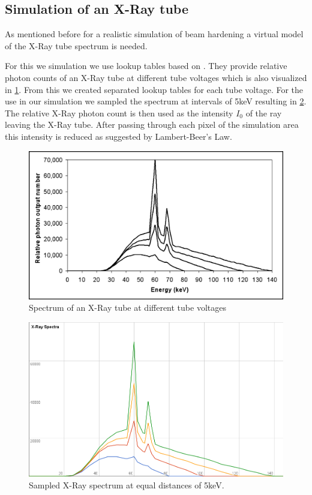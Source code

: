 \subsection{Simulation of an X-Ray tube}
\par As mentioned before for a realistic simulation of beam hardening a virtual model of the X-Ray tube spectrum is needed.\cite{XRayTubeSpectrum}
\par For this we simulation we use lookup tables based on \cite{XRayTubeSpectrum}. They provide relative photon counts of an X-Ray tube at different tube voltages which is also visualized in \ref{f5}. From this we created separated lookup tables for each tube voltage. For the use in our simulation we sampled the spectrum at intervals of 5keV resulting in \ref{SampledTubeSpectrum}. The relative X-Ray photon count is then used as the intensity \(I_{0}\) of the ray leaving the X-Ray tube. After passing through each pixel of the simulation area this intensity is reduced as suggested by Lambert-Beer's Law.
\begin{figure}[h]
	\centering
	\includegraphics[width=0.6\linewidth]{images/F5large.jpg}
	\caption{Spectrum of an X-Ray tube at different tube voltages\cite{XRayTubeSpectrum}}
	\label{f5}
\end{figure}
\begin{figure}[h]
	\centering
	\includegraphics[width=0.5\linewidth]{images/tubeSpectrum.png}
	\caption{Sampled X-Ray spectrum at equal distances of 5keV.}
	\label{SampledTubeSpectrum}
\end{figure}
